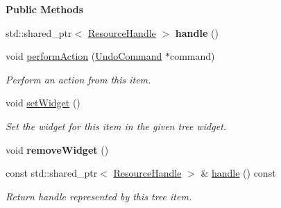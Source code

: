 \begin{Indent}\textbf{ Public Methods}\par
\begin{DoxyCompactItemize}
\item 
\mbox{\label{classrev_1_1_view_1_1_resource_item_a3d50a484be0b2c7d004abfaf48740ebd}} 
std\+::shared\+\_\+ptr$<$ \mbox{\hyperlink{classrev_1_1_resource_handle}{Resource\+Handle}} $>$ {\bfseries handle} ()
\item 
\mbox{\label{classrev_1_1_view_1_1_resource_item_a4256ff7d43c6e0ed6896c176f82301e7}} 
void \mbox{\hyperlink{classrev_1_1_view_1_1_resource_item_a4256ff7d43c6e0ed6896c176f82301e7}{perform\+Action}} (\mbox{\hyperlink{classrev_1_1_undo_command}{Undo\+Command}} $\ast$command)
\begin{DoxyCompactList}\small\item\em Perform an action from this item. \end{DoxyCompactList}\item 
void \mbox{\hyperlink{classrev_1_1_view_1_1_resource_item_a3bb7af636d29308aa374f0845a69e483}{set\+Widget}} ()
\begin{DoxyCompactList}\small\item\em Set the widget for this item in the given tree widget. \end{DoxyCompactList}\item 
\mbox{\label{classrev_1_1_view_1_1_resource_item_a5d7155aa6f71f439fbf7098ff5c29f4b}} 
void {\bfseries remove\+Widget} ()
\item 
\mbox{\label{classrev_1_1_view_1_1_resource_item_af34c72d5770e32e795089465b3f3025b}} 
const std\+::shared\+\_\+ptr$<$ \mbox{\hyperlink{classrev_1_1_resource_handle}{Resource\+Handle}} $>$ \& \mbox{\hyperlink{classrev_1_1_view_1_1_resource_item_af34c72d5770e32e795089465b3f3025b}{handle}} () const
\begin{DoxyCompactList}\small\item\em Return handle represented by this tree item. \end{DoxyCompactList}\item 
\mbox{\label{classrev_1_1_view_1_1_resource_item_a6b42cb2befbe8779b1f77e4b74e7c78d}} 

\end{DoxyCompactItemize}
\end{Indent}
